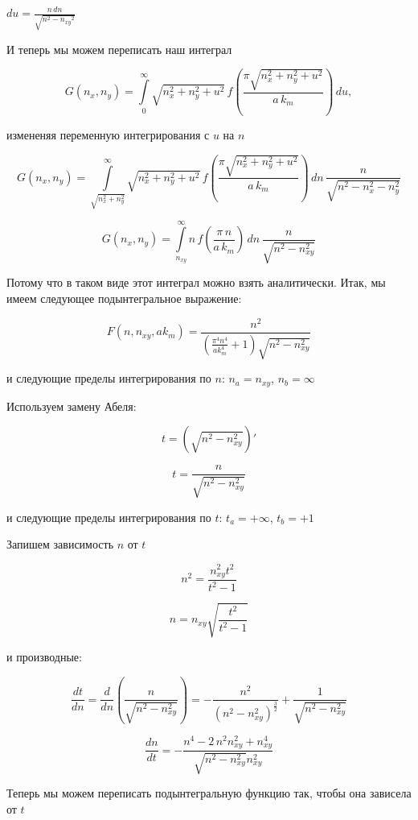 \documentclass[11pt]{article}
\begin{document}
\(d{u}= \frac{n\,d{n}}{\sqrt{n^{2} - \mathit{n_{xy}}^{2}}}\)

    И теперь мы можем переписать наш интеграл

    \[G\left(n_x, n_y\right) = \int\limits_{0}^{\infty}\sqrt{n_x^2 + n_y^2+u^2}\,
f\left(\frac{\pi\sqrt{n_x^2 + n_y^2+u^2}}{a\,k_m}\right)\,d{u}, 
\]

измененяя переменную интегрирования с \(u\) на \(n\)

    \[
G\left(n_x, n_y\right) = \int\limits_{\sqrt{n_x^2 + n_y^2}}^{\infty}\sqrt{n_x^2 + n_y^2+u^2}\,
f\left(\frac{\pi\sqrt{n_x^2 + n_y^2+u^2}}{a\,k_m}\right)\,dn\,{\frac{n}{\sqrt{n^{2} - n_{x}^{2} - n_{y}^{2}}}}
\]

    \[
G\left(n_x, n_y\right) = \int\limits_{n_{xy}}^{\infty}n\,
f\left(\frac{\pi\,n}{a\,k_m}\right)\,dn\,{\frac{n}{\sqrt{n^{2} - n_{xy}^{2}}}}
\]

    Потому что в таком виде этот интеграл можно взять аналитически. Итак, мы
имеем следующее подынтегральное выражение:

    \[F\left(n, n_{xy}, ak_m\right) = \frac{n^{2}}{{\left(\frac{\pi^{4} n^{4}}{\mathit{ak}_{m}^{4}} + 1\right)} \sqrt{n^{2} - n_{\mathit{xy}}^{2}}}\]

    и следующие пределы интегрирования по \(n\): \(n_a = n_{xy}\),
\(n_b = \infty\)

    Используем замену Абеля:

\[t = \left(\sqrt{n^2-n_{xy}^2}\right)'\]

    \[t = \frac{n}{\sqrt{n^{2} - n_{\mathit{xy}}^{2}}}\]

    и следующие пределы интегрирования по \(t\): \(t_a = +\infty\),
\(t_b = +1\)

    Запишем зависимость \(n\) от \(t\)

    \[n^{2} = \frac{n_{\mathit{xy}}^{2} t^{2}}{t^{2} - 1}\]

    \[n = n_{\mathit{xy}} \sqrt{\frac{t^{2}}{t^{2} - 1}}\]

    и производные:

    \[\frac{dt}{dn} = \frac{d}{dn} \left( \frac{n}{\sqrt{n^{2} - n_{\mathit{xy}}^{2}}} \right)= -\frac{n^{2}}{{\left(n^{2} - n_{\mathit{xy}}^{2}\right)}^{\frac{3}{2}}} + \frac{1}{\sqrt{n^{2} - n_{\mathit{xy}}^{2}}}\]

    \[\frac{dn}{dt} = -\frac{n^{4} - 2 \, n^{2} n_{\mathit{xy}}^{2} + n_{\mathit{xy}}^{4}}{\sqrt{n^{2} - n_{\mathit{xy}}^{2}} n_{\mathit{xy}}^{2}}\]

    Теперь мы можем переписать подынтегральную функцию так, чтобы она
зависела от \(t\)
\end{document}
